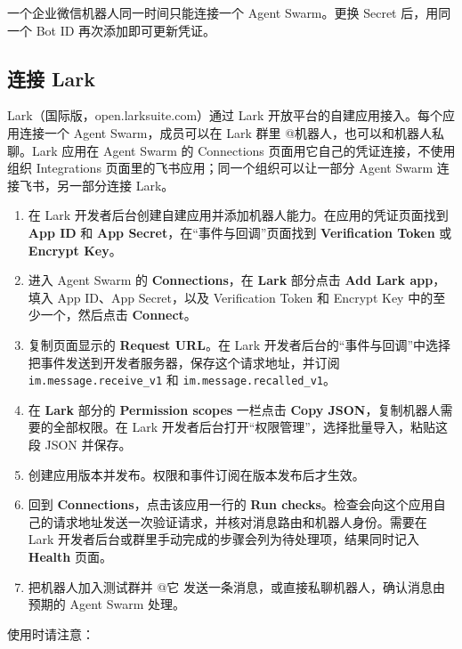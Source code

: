 \documentclass[UTF8,a4paper,11pt]{ctexart}
\begin{document}
一个企业微信机器人同一时间只能连接一个 Agent Swarm。更换 Secret 后，用同一个 Bot ID 再次添加即可更新凭证。

\subsection{连接 Lark}

Lark（国际版，open.larksuite.com）通过 Lark 开放平台的自建应用接入。每个应用连接一个 Agent Swarm，成员可以在 Lark 群里 @机器人，也可以和机器人私聊。Lark 应用在 Agent Swarm 的 Connections 页面用它自己的凭证连接，不使用组织 Integrations 页面里的飞书应用；同一个组织可以让一部分 Agent Swarm 连接飞书，另一部分连接 Lark。

\begin{enumerate}
  \item 在 Lark 开发者后台创建自建应用并添加机器人能力。在应用的凭证页面找到 \textbf{App ID} 和 \textbf{App Secret}，在“事件与回调”页面找到 \textbf{Verification Token} 或 \textbf{Encrypt Key}。
  \item 进入 Agent Swarm 的 \textbf{Connections}，在 \textbf{Lark} 部分点击 \textbf{Add Lark app}，填入 App ID、App Secret，以及 Verification Token 和 Encrypt Key 中的至少一个，然后点击 \textbf{Connect}。
  \item 复制页面显示的 \textbf{Request URL}。在 Lark 开发者后台的“事件与回调”中选择把事件发送到开发者服务器，保存这个请求地址，并订阅 \texttt{im.message.receive\_v1} 和 \texttt{im.message.recalled\_v1}。
  \item 在 \textbf{Lark} 部分的 \textbf{Permission scopes} 一栏点击 \textbf{Copy JSON}，复制机器人需要的全部权限。在 Lark 开发者后台打开“权限管理”，选择批量导入，粘贴这段 JSON 并保存。
  \item 创建应用版本并发布。权限和事件订阅在版本发布后才生效。
  \item 回到 \textbf{Connections}，点击该应用一行的 \textbf{Run checks}。检查会向这个应用自己的请求地址发送一次验证请求，并核对消息路由和机器人身份。需要在 Lark 开发者后台或群里手动完成的步骤会列为待处理项，结果同时记入 \textbf{Health} 页面。
  \item 把机器人加入测试群并 @它 发送一条消息，或直接私聊机器人，确认消息由预期的 Agent Swarm 处理。
\end{enumerate}

使用时请注意：
\end{document}
